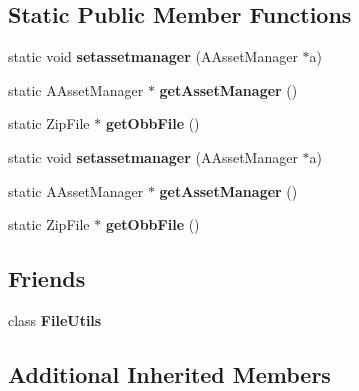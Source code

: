 \subsection*{Static Public Member Functions}
\begin{DoxyCompactItemize}
\item 
\mbox{\label{classFileUtilsAndroid_a5dff792c2f7d57ff0f6f46c5dcffc2ab}} 
static void {\bfseries setassetmanager} (A\+Asset\+Manager $\ast$a)
\item 
\mbox{\label{classFileUtilsAndroid_a0b450f8f8ccdbb44c4c108e62b54e2c7}} 
static A\+Asset\+Manager $\ast$ {\bfseries get\+Asset\+Manager} ()
\item 
\mbox{\label{classFileUtilsAndroid_a1094ca5747ca8d20caad6fa9b887f929}} 
static Zip\+File $\ast$ {\bfseries get\+Obb\+File} ()
\item 
\mbox{\label{classFileUtilsAndroid_a2e9d148abee88fb9d30a931c09d8adb6}} 
static void {\bfseries setassetmanager} (A\+Asset\+Manager $\ast$a)
\item 
\mbox{\label{classFileUtilsAndroid_a0b450f8f8ccdbb44c4c108e62b54e2c7}} 
static A\+Asset\+Manager $\ast$ {\bfseries get\+Asset\+Manager} ()
\item 
\mbox{\label{classFileUtilsAndroid_a1094ca5747ca8d20caad6fa9b887f929}} 
static Zip\+File $\ast$ {\bfseries get\+Obb\+File} ()
\end{DoxyCompactItemize}
\subsection*{Friends}
\begin{DoxyCompactItemize}
\item 
\mbox{\label{classFileUtilsAndroid_ab3d3da2a9e626c1aae143a4f83d35bdf}} 
class {\bfseries File\+Utils}
\end{DoxyCompactItemize}
\subsection*{Additional Inherited Members}


